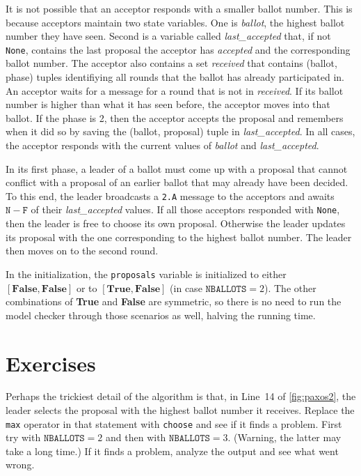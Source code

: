 \documentclass{report}
\begin{document}
It is not possible that an acceptor responds with a smaller ballot
number.  This is because acceptors maintain two state variables.
One is \textit{ballot}, the highest ballot number they have seen.
Second is a variable called \textit{last\_accepted} that, if not
\texttt{None}, contains the last proposal the acceptor has
\emph{accepted} and the corresponding ballot number.  The acceptor
also contains a set \emph{received} that contains (ballot, phase)
tuples identifiying all rounds that the ballot has already participated
in.  An acceptor waits for a message for a round that is not in
\emph{received}.  If its ballot number is higher than what it has
seen before, the acceptor moves into that ballot.  If the phase is
2, then the acceptor accepts the proposal and remembers when it did
so by saving the (ballot, proposal) tuple in \textit{last\_accepted}.
In all cases, the acceptor responds with the current values of
\textit{ballot} and \textit{last\_accepted}.

In its first phase, a leader of a ballot must come up with a proposal that
cannot conflict with a proposal of an earlier ballot that may already
have been decided.  To this end, the leader broadcasts a \texttt{2.A}
message to the acceptors and awaits $\mathtt{N} - \mathtt{F}$ of their
\textit{last\_accepted}
values.  If all those acceptors responded with \texttt{None}, then the leader
is free to choose its own proposal.  Otherwise the leader updates
its proposal with the one corresponding to the highest ballot number.
The leader then moves on to the second round.

In the initialization, the \texttt{proposals} variable is initialized
to either $[\mathbf{False}, \mathbf{False}]$ or
to $[\mathbf{True}, \mathbf{False}]$ (in case $\texttt{NBALLOTS} = 2$).
The other combinations of \textbf{True} and \textbf{False} are symmetric,
so there is no need to run the model checker through those scenarios as
well, halving the running time.

\section*{Exercises}
\begin{problems}
\item Perhaps the trickiest detail of the algorithm is that, in Line~14
of \autoref{fig:paxos2}, the leader selects the proposal with the highest
ballot number it receives.  Replace the \texttt{max} operator in that statement
with \texttt{choose} and see if it finds a problem.  First try with
$\texttt{NBALLOTS} = 2$ and then with $\texttt{NBALLOTS} = 3$.
(Warning, the latter may take a long time.)  If it finds a problem,
analyze the output and see what went wrong.
\end{problems}
\end{document}
